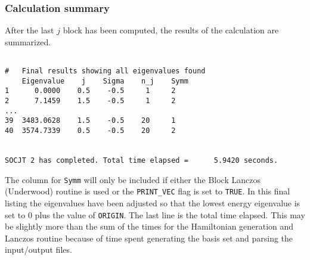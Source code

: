 \documentclass{article}
\newcommand{\wn}{cm$^{-1}$}
\begin{document}


\subsubsection{Calculation summary}
After the last $j$ block has been computed, the results of the
calculation are summarized.
\begin{verbatim} 

#	Final results showing all eigenvalues found
    Eigenvalue    j    Sigma    n_j    Symm
1      0.0000    0.5    -0.5     1     2
2      7.1459    1.5    -0.5     1     2
...
39  3483.0628    1.5    -0.5    20     1
40  3574.7339    0.5    -0.5    20     2

 
SOCJT 2 has completed. Total time elapsed =      5.9420 seconds.
\end{verbatim}
The column for {\tt Symm} will only be included if either the Block Lanczos (Underwood) routine is used or the {\tt PRINT\_VEC} flag is set to {\tt TRUE}. In this final listing the eigenvalues have been adjusted so that the lowest energy eigenvalue is set to 0 plus the value of {\tt ORIGIN}. The last line is the total time elapsed. This may be slightly more than the sum of the times for the Hamiltonian generation and Lanczos routine because of time spent generating the basis set and parsing the input/output files.
\end{document}
